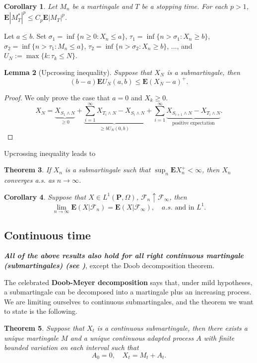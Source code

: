 \documentclass[twoside, 12pt]{book}
\numberwithin{equation}{chapter}
\newtheorem{theorem}{Theorem}[section]
\newtheorem{lemma}[theorem]{Lemma}
\newtheorem{corollary}[theorem]{Corollary}
\def\cF{{\mathcal F}}
\def\bE{{\mathbf E}}
\def\bP{{\mathbf P}}
\def\geq{\geqslant}
\def\leq{\leqslant}
\begin{document}
	\begin{corollary}\label{Cor-Lp}
		Let $M_n$ be a martingale and $T$ be a stopping time. For each $p>1$, $\bE |M_T^*|^p \leq C_p \bE |M_T|^p$. 
	\end{corollary}
	
	 Let $a\leq b$. Set $\sigma_1=\inf\{n\geq 0: X_n\leq a\}$, $\tau_1= \inf\{n>\sigma_1: X_n\geq b\}$, $\sigma_2=\inf\{n>\tau_1: M_n\leq a\}$, $\tau_2= \inf\{n>\sigma_2: X_n\geq b\}$, $\dots$, and 
	$U_N:= \max\{k: \tau_k\leq N\}$. 
	\begin{lemma}[Upcrossing inequality]
		Suppose that $X_N$ is a submartingale, then 
		\[
		(b-a)\bE U_N(a,b) \leq \bE (X_{N}-a)^+. 
		\]
	\end{lemma}
	\begin{proof}
		We only prove the case that $a=0$ and $X_k\geq 0$. 
		\[
		X_N=\underbrace{X_{S_1\wedge N}}_{\geq 0}+\underbrace{\sum_{i=1}^\infty X_{T_i\wedge N}-X_{S_i\wedge N}}_{\geq bU_N(0,b)}+ \sum_{i=1}^\infty \underbrace{X_{S_{i+1}\wedge N}-X_{T_i\wedge N}}_{\mbox{positive expectation}}. 
		\] 
	\end{proof}
	Upcrossing inequality leads to 
	\begin{theorem}
		If $X_n$ is a submartingale such that $\sup_{n} \bE X_n^{+}<\infty$, then $X_n$ converges a.s. as $n\to \infty$. 
	\end{theorem}
	\begin{corollary}\label{Cor-convergence}
		Suppose that $X\in L^1(\bP, \Omega)$, $\cF_n\uparrow \cF_\infty$, then 
		\[
		\lim_{n\to\infty}\bE (X|\cF_n) = \bE (X|\cF_\infty),\quad a.s. \mbox{ and in } L^1. 
		\]
	\end{corollary} 
	
	\subsection{Continuous time}
	
	{\bf {\em All of the above results also hold for all right continuous martingale (submartingales) (see \cite{Huang})}}, except the Doob decomposition theorem. 
	
	The celebrated {\bf Doob-Meyer decomposition} says that, under mild hypotheses, a submartingale can be decomposed into a martingale plus an increasing process. We are limiting ourselves to continuous submartingales, and the theorem we want to state is the following.
	
	\begin{theorem}
		Suppose that $X_t$ is a continuous submartingale, then there exists a unique martingale $M$ and a unique continuous adapted process $A$ with finite bounded variation on each interval such that 
		\[
		A_0=0, \quad X_t= M_t+A_t. 
		\]
	\end{theorem}
	
\end{document}

